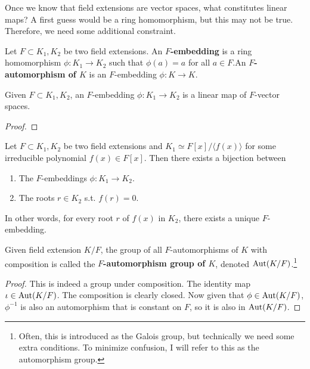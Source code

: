   Once we know that field extensions are vector spaces, what constitutes linear maps? A first guess would be a ring homomorphism, but this may not be true. Therefore, we need some additional constraint. 

  \begin{definition}
    Let $F \subset K_1, K_2$ be two field extensions. An \textbf{$F$-embedding} is a ring homomorphism $\phi: K_1 \to K_2$ such that $\phi(a) = a$ for all $a \in F$.An \textbf{$F$-automorphism of $K$} is an $F$-embedding $\phi: K \to K$. 
  \end{definition}

  \begin{lemma}
    Given $F \subset K_1, K_2$, an $F$-embedding $\phi: K_1 \to K_2$ is a linear map of $F$-vector spaces.  
  \end{lemma}
  \begin{proof}
    
  \end{proof}

  \begin{lemma}
    Let $F \subset K_1, K_2$ be two field extensions and $K_1 \simeq F[x] / \langle f(x) \rangle$ for some irreducible polynomial $f(x) \in F[x]$. Then there exists a bijection between 
    \begin{enumerate}
      \item The $F$-embeddings $\phi: K_1 \to K_2$. 
      \item The roots $r \in K_2$ s.t. $f(r) = 0$. 
    \end{enumerate}
    In other words, for every root $r$ of $f(x)$ in $K_2$, there exists a unique $F$-embedding. 
  \end{lemma}

  \begin{definition}
    Given field extension $K/F$, the group of all $F$-automorphisms of $K$ with composition is called the \textbf{$F$-automorphism group of $K$}, denoted $\Aut(K/F)$.\footnote{Often, this is introduced as the Galois group, but technically we need some extra conditions. To minimize confusion, I will refer to this as the automorphism group.}
  \end{definition}
  \begin{proof}
    This is indeed a group under composition. The identity map $\iota \in \Aut(K/F)$. The composition is clearly closed. Now given that $\phi \in \Aut(K/F)$, $\phi^{-1}$ is also an automorphism that is constant on $F$, so it is also in $\Aut(K/F)$. 
  \end{proof} 

